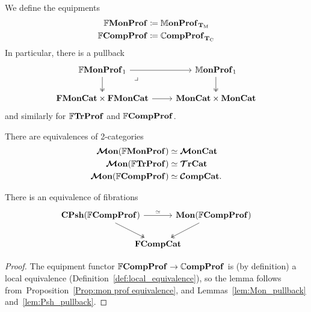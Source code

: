 \documentclass[12pt,oneside,article,draft]{memoir}
\begin{document}
\begin{definition}\label{def:FrMonProf_FrCompProf}
   We define the equipments
   \begin{align*}
      \mathbb{F}\mathbf{MonProf}&\coloneqq\mathbb{M}\mathbf{onProf}_{\mathbf{T}_{\textrm{M}}} \\
      \mathbb{F}\mathbf{CompProf}&\coloneqq\mathbb{C}\mathbf{ompProf}_{\mathbf{T}_{\textrm{C}}}
   \end{align*}
   In particular, there is a pullback
   \begin{equation*}
      \begin{tikzcd}
         \dFrMonProf_1 \ar[r] \ar[d,two heads] \ar[dr,phantom,"\lrcorner" very near start]
            & \dMonProf_1 \ar[d,two heads] \\
         \FrMonCat\times\FrMonCat \ar[r]
            & \MonCat\times\MonCat
      \end{tikzcd}
   \end{equation*}
   and similarly for $\mathbb{F}\mathbf{TrProf}$ and $\mathbb{F}\mathbf{CompProf}$.
\end{definition}

\begin{corollary}\label{cor:TrCat_ObjectFree}
   There are equivalences of 2-categories
   \begin{align*}
      \bm{\mathcal{M}}\mathbf{on}(\mathbb{F}\mathbf{MonProf})&\simeq\bm{\mathcal{M}}\mathbf{onCat} \\
      \bm{\mathcal{M}}\mathbf{on}(\mathbb{F}\mathbf{TrProf})&\simeq\bm{\mathcal{T}}\mathbf{rCat} \\
      \bm{\mathcal{M}}\mathbf{on}(\mathbb{F}\mathbf{CompProf})&\simeq\bm{\mathcal{C}}\mathbf{ompCat}.
   \end{align*}
\end{corollary}

\begin{lemma}\label{lem:FrCompProf_Psh_Mon}
   There is an equivalence of fibrations
   \begin{equation*}
      \begin{tikzcd}[column sep=-1.5em]
         \CPsh(\dFrCompProf) \ar[rr,"\equiv"] \ar[dr,two heads]
            && \Mon(\dFrCompProf) \ar[dl,two heads] \\
            & \FrCompCat &
      \end{tikzcd}
   \end{equation*}
\end{lemma}
\begin{proof}
   The equipment functor $\mathbb{F}\mathbf{CompProf}\to\mathbb{C}\mathbf{ompProf}$ is (by definition) a local equivalence
   (Definition~\ref{def:local_equivalence}), so the lemma follows from~Proposition~\ref{Prop:mon
   prof equivalence}, and Lemmas~\ref{lem:Mon_pullback} and~\ref{lem:Psh_pullback}.
\end{proof}
\end{document}
